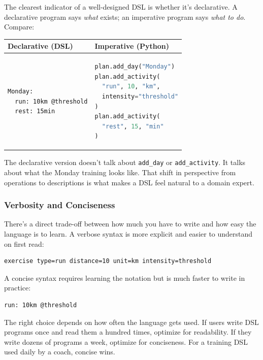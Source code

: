 The clearest indicator of a well-designed DSL is whether it's declarative. A declarative
program says \emph{what} exists; an imperative program says \emph{what to do}. Compare:

\begin{center}
\begin{tabular}{p{5.5cm}p{5.5cm}}
\hline
\textbf{Declarative (DSL)} & \textbf{Imperative (Python)} \\
\hline
\begin{lstlisting}
Monday:
  run: 10km @threshold
  rest: 15min
\end{lstlisting}
&
\begin{lstlisting}[language=Python]
plan.add_day("Monday")
plan.add_activity(
  "run", 10, "km",
  intensity="threshold"
)
plan.add_activity(
  "rest", 15, "min"
)
\end{lstlisting}
\\
\hline
\end{tabular}
\end{center}

The declarative version doesn't talk about \texttt{add\_day} or \texttt{add\_activity}.
It talks about what the Monday training looks like. That shift in perspective from
operations to descriptions is what makes a DSL feel natural to a domain expert.

\subsubsection{Verbosity and Conciseness}

There's a direct trade-off between how much you have to write and how easy the language
is to learn. A verbose syntax is more explicit and easier to understand on first read:

\begin{lstlisting}
exercise type=run distance=10 unit=km intensity=threshold
\end{lstlisting}

A concise syntax requires learning the notation but is much faster to write in practice:

\begin{lstlisting}
run: 10km @threshold
\end{lstlisting}

The right choice depends on how often the language gets used. If users write DSL programs
once and read them a hundred times, optimize for readability. If they write dozens of
programs a week, optimize for conciseness. For a training DSL used daily by a coach,
concise wins.


